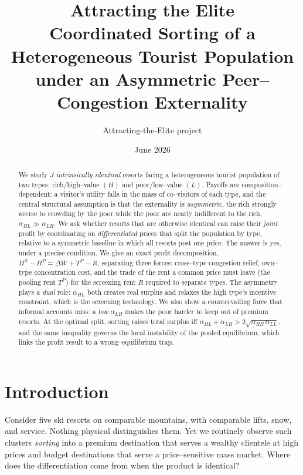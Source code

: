 \documentclass[11pt]{article}
\title{\textbf{Attracting the Elite}\\[0.4em]
\large Coordinated Sorting of a Heterogeneous Tourist Population\\
under an Asymmetric Peer--Congestion Externality}
\author{Attracting-the-Elite project}
\date{June 2026}
\theoremstyle{plain}
\theoremstyle{definition}
\theoremstyle{remark}
\newcommand{\aHH}{\alpha_{HH}}
\newcommand{\aHL}{\alpha_{HL}}
\newcommand{\aLH}{\alpha_{LH}}
\newcommand{\aLL}{\alpha_{LL}}
\newcommand{\TP}{T^{P}}
\newcommand{\PiP}{\Pi^{P}}
\newcommand{\PiS}{\Pi^{S}}
\begin{document}
\maketitle

\begin{abstract}
\noindent
We study $J$ \emph{intrinsically identical} resorts facing a heterogeneous tourist
population of two types: rich/high--value $(H)$ and poor/low--value $(L)$. Payoffs are
composition--dependent: a visitor's utility falls in the mass of co--visitors of each type,
and the central structural assumption is that the externality is \emph{asymmetric}, the rich
strongly averse to crowding by the poor while the poor are nearly indifferent to the rich,
$\aHL \gg \aLH$. We ask whether resorts that are otherwise identical can raise their
\emph{joint} profit by coordinating on \emph{differentiated} prices that split the population
by type, relative to a symmetric baseline in which all resorts post one price. The answer is
yes, under a precise condition. We give an exact profit decomposition,
$\PiS - \PiP = \Delta W + \TP - R$, separating three forces: cross--type congestion relief,
own--type concentration cost, and the trade of the rent a common price must leave (the
pooling rent $\TP$) for the screening rent $R$ required to separate types. The asymmetry
plays a \emph{dual} role: $\aHL$ both creates real surplus and relaxes the high type's
incentive constraint, which is the screening technology. We also show a countervailing force
that informal accounts miss: a \emph{low} $\aLH$ makes the poor harder to keep out of premium
resorts. At the optimal split, sorting raises total surplus iff
$\aHL + \aLH > 2\sqrt{\aHH\,\aLL}$, and the same inequality governs the local instability of
the pooled equilibrium, which links the profit result to a wrong--equilibrium trap.
\end{abstract}

\tableofcontents
\bigskip

\section{Introduction}

Consider five ski resorts on comparable mountains, with comparable lifts, snow, and service.
Nothing physical distinguishes them. Yet we routinely observe such clusters \emph{sorting}
into a premium destination that serves a wealthy clientele at high prices and budget
destinations that serve a price--sensitive mass market. Where does the differentiation come
from when the product is identical?
\end{document}
